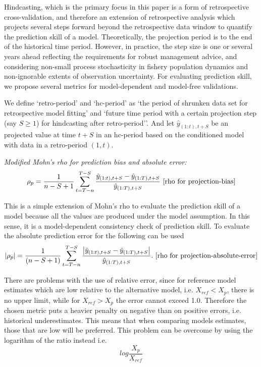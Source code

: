 Hindcasting, which is the primary focus in this paper is a form of retrospective cross-validation, and therefore an extension of retrospective analysis which projects several steps forward beyond the retrospective data window to quantify the prediction skill of a model. Theoretically, the projection period is to the end of the historical time period. However, in practice, the step size is one or several years ahead reflecting the requirements for robust management advice, and considering non-small process stochasticity in fishery population dynamics and non-ignorable extents of observation uncertainty. For evaluating prediction skill, we propose several metrics for model-dependent and model-free validations.

We  define `retro-period' and `hc-period' as `the period of shrunken data set for retrospective model fitting' and `future time period with a certain projection step (say $S \geq 1$) for hindcasting after retro-period''. And let $\hat{y}_{(1:t),t+S}$ be an projected value at time $t+S$ in an hc-period based on the conditioned model with data in a retro-period $(1,t)$. 

\vspace{0.2cm} \noindent
{\it Modified Mohn's rho for prediction bias and absolute error:}\\
\begin{equation}
\label{eqn:mohn2}
\rho_p = \displaystyle \frac{1}{n-S+1} \sum_{t=T-n}^{T-S} 
\frac{\hat{y}_{(1:t),t+S}-\hat{y}_{(1:T),t+S}}{\hat{y}_{(1:T),t+S}} 
\ \mbox{[rho for projection-bias]}
\end{equation} 

This is a simple extension of Mohn's rho to evaluate the prediction skill of a model because all the values are produced under the model assumption. In this sense, it is a model-dependent consistency check of prediction skill. To evaluate the absolute prediction error for the following can be used
\begin{equation}
\label{eqn:mohn3}
|\rho_p| = \displaystyle \frac{1}{(n-S+1)} \sum_{t=T-n}^{T-S}
\frac{\left| \hat{y}_{(1:t),t+S}-\hat{y}_{(1:T),t+S} \right|}{\hat{y}_{(1:T),t+S}}. 
\ \mbox{[rho for projection-absolute-error]}
\end{equation} 

There are problems with the use of relative error, since for reference model estimates which are low relative to the alternative model, i.e. $X_{ref} < X_{p}$, there is no upper limit, while for $X_{ref} > X_{p}$ the error cannot exceed 1.0. Therefore the chosen metric puts a heavier penalty on negative than on positive errors, i.e. historical underestimates. This means that when comparing models estimates, those that are low will be preferred. This problem can be overcome by using the logarithm of the ratio instead i.e. 
\begin{equation}
\label{eqn:re}
log\frac{X_{p}}{X_{ref}}
\end{equation}

